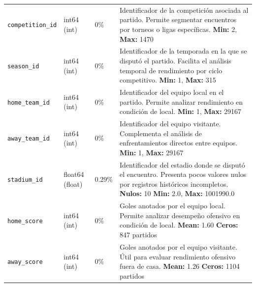 \documentclass[12pt,a4paper]{article}
\begin{document}
\begin{center}
\begin{longtable}{T{4.5cm} C{2.5cm} C{0.8cm} p{7.0cm}}
\texttt{competition\_id} & int64 \newline (int) & 0\% & Identificador de la competición asociada al partido. Permite segmentar encuentros por torneos o ligas específicas. \newline \textbf{Min:} 2, \textbf{Max:} 1470 \\

\texttt{season\_id} & int64 \newline (int) & 0\% & Identificador de la temporada en la que se disputó el partido. Facilita el análisis temporal de rendimiento por ciclo competitivo. \newline \textbf{Min:} 1, \textbf{Max:} 315 \\

\texttt{home\_team\_id} & int64 \newline (int) & 0\% & Identificador del equipo local en el partido. Permite analizar rendimiento en condición de local. \newline \textbf{Min:} 1, \textbf{Max:} 29167 \\

\texttt{away\_team\_id} & int64 \newline (int) & 0\% & Identificador del equipo visitante. Complementa el análisis de enfrentamientos directos entre equipos. \newline \textbf{Min:} 1, \textbf{Max:} 29167 \\

\texttt{stadium\_id} & float64 \newline (float) & \textcolor{orangenull}{0.29\%} & Identificador del estadio donde se disputó el encuentro. Presenta pocos valores nulos por registros históricos incompletos. \newline \textbf{Nulos:} 10 \newline \textbf{Min:} 2.0, \textbf{Max:} 1001990.0 \\

\texttt{home\_score} & int64 \newline (int) & 0\% & Goles anotados por el equipo local. Permite analizar desempeño ofensivo en condición de local. \newline \textbf{Mean:} 1.60 \newline \textbf{Ceros:} 847 partidos \\

\texttt{away\_score} & int64 \newline (int) & 0\% & Goles anotados por el equipo visitante. Útil para evaluar rendimiento ofensivo fuera de casa. \newline \textbf{Mean:} 1.26 \newline \textbf{Ceros:} 1104 partidos \\


\end{longtable}
\end{center}
\end{document}
